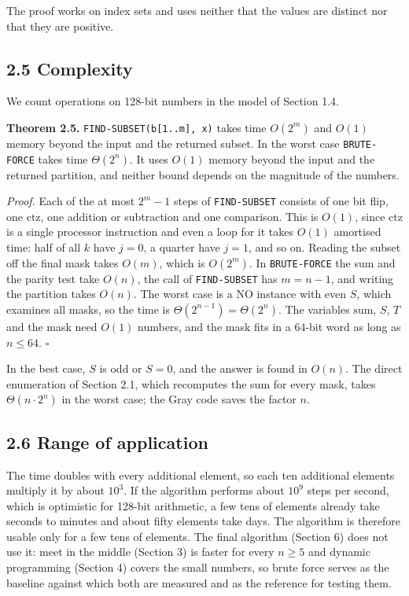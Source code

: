 \documentclass[
]{article}
\begin{document}
The proof works on index sets and uses neither that the values are
distinct nor that they are positive.

\hypertarget{complexity}{%
\subsection{2.5 Complexity}\label{complexity}}

We count operations on 128-bit numbers in the model of Section 1.4.

\textbf{Theorem 2.5.} \texttt{FIND-SUBSET(b{[}1..m{]},\ x)} takes time
\(O(2^m)\) and \(O(1)\) memory beyond the input and the returned subset.
In the worst case \texttt{BRUTE-FORCE} takes time \(\Theta(2^n)\). It
uses \(O(1)\) memory beyond the input and the returned partition, and
neither bound depends on the magnitude of the numbers.

\emph{Proof.} Each of the at most \(2^m - 1\) steps of
\texttt{FIND-SUBSET} consists of one bit flip, one \(\mathrm{ctz}\), one
addition or subtraction and one comparison. This is \(O(1)\), since
\(\mathrm{ctz}\) is a single processor instruction and even a loop for
it takes \(O(1)\) amortised time: half of all \(k\) have \(j = 0\), a
quarter have \(j = 1\), and so on. Reading the subset off the final mask
takes \(O(m)\), which is \(O(2^m)\). In \texttt{BRUTE-FORCE} the sum and
the parity test take \(O(n)\), the call of \texttt{FIND-SUBSET} has
\(m = n - 1\), and writing the partition takes \(O(n)\). The worst case
is a NO instance with even \(S\), which examines all masks, so the time
is \(\Theta(2^{n-1}) = \Theta(2^n)\). The variables \(\mathrm{sum}\),
\(S\), \(T\) and the mask need \(O(1)\) numbers, and the mask fits in a
64-bit word as long as \(n \le 64\). \(\square\)

In the best case, \(S\) is odd or \(S = 0\), and the answer is found in
\(O(n)\). The direct enumeration of Section 2.1, which recomputes the
sum for every mask, takes \(\Theta(n \cdot 2^n)\) in the worst case; the
Gray code saves the factor \(n\).

\hypertarget{range-of-application}{%
\subsection{2.6 Range of application}\label{range-of-application}}

The time doubles with every additional element, so each ten additional
elements multiply it by about \(10^3\). If the algorithm performs about
\(10^9\) steps per second, which is optimistic for 128-bit arithmetic, a
few tens of elements already take seconds to minutes and about fifty
elements take days. The algorithm is therefore usable only for a few
tens of elements. The final algorithm (Section 6) does not use it: meet
in the middle (Section 3) is faster for every \(n \ge 5\) and dynamic
programming (Section 4) covers the small numbers, so brute force serves
as the baseline against which both are measured and as the reference for
testing them.
\end{document}
